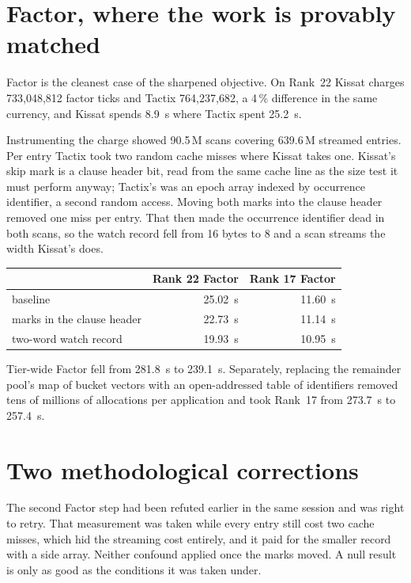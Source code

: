 \documentclass[11pt]{article}
\begin{document}
\section{Factor, where the work is provably matched}

Factor is the cleanest case of the sharpened objective. On Rank~22 Kissat
charges 733{,}048{,}812 factor ticks and Tactix 764{,}237{,}682, a 4\,\%
difference in the same currency, and Kissat spends 8.9~s where Tactix spent
25.2~s.

Instrumenting the charge showed 90.5\,M scans covering 639.6\,M streamed
entries. Per entry Tactix took two random cache misses where Kissat takes one.
Kissat's skip mark is a clause header bit, read from the same cache line as the
size test it must perform anyway; Tactix's was an epoch array indexed by
occurrence identifier, a second random access. Moving both marks into the
clause header removed one miss per entry. That then made the occurrence
identifier dead in both scans, so the watch record fell from 16 bytes to 8 and
a scan streams the width Kissat's does.

\begin{center}
\begin{tabular}{lrr}
\toprule
 & Rank 22 Factor & Rank 17 Factor \\
\midrule
baseline                    & 25.02~s & 11.60~s \\
marks in the clause header  & 22.73~s & 11.14~s \\
two-word watch record       & 19.93~s & 10.95~s \\
\bottomrule
\end{tabular}
\end{center}

Tier-wide Factor fell from 281.8~s to 239.1~s. Separately, replacing the
remainder pool's map of bucket vectors with an open-addressed table of
identifiers removed tens of millions of allocations per application and took
Rank~17 from 273.7~s to 257.4~s.

\section{Two methodological corrections}

The second Factor step had been refuted earlier in the same session and was
right to retry. That measurement was taken while every entry still cost two
cache misses, which hid the streaming cost entirely, and it paid for the
smaller record with a side array. Neither confound applied once the marks
moved. A null result is only as good as the conditions it was taken under.
\end{document}
